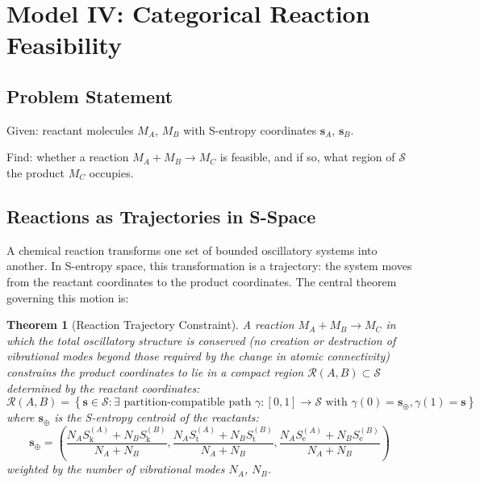 \documentclass[11pt,twocolumn,a4paper]{article}
\newtheorem{theorem}{Theorem}[section]
\theoremstyle{definition}
\theoremstyle{remark}
\newcommand{\Sk}{S_{\mathrm{k}}}
\newcommand{\St}{S_{\mathrm{t}}}
\newcommand{\Se}{S_{\mathrm{e}}}
\newcommand{\Sspace}{\mathcal{S}}
\begin{document}
\section{Model IV: Categorical Reaction Feasibility}
\label{sec:model4}

\subsection{Problem Statement}

Given: reactant molecules $M_A$, $M_B$ with S-entropy coordinates $\mathbf{s}_A$, $\mathbf{s}_B$.

Find: whether a reaction $M_A + M_B \to M_C$ is feasible, and if so, what region of $\Sspace$ the product $M_C$ occupies.

\subsection{Reactions as Trajectories in S-Space}

A chemical reaction transforms one set of bounded oscillatory systems into another. In S-entropy space, this transformation is a trajectory: the system moves from the reactant coordinates to the product coordinates. The central theorem governing this motion is:

\begin{theorem}[Reaction Trajectory Constraint]
\label{thm:reaction_trajectory}
A reaction $M_A + M_B \to M_C$ in which the total oscillatory structure is conserved (no creation or destruction of vibrational modes beyond those required by the change in atomic connectivity) constrains the product coordinates to lie in a compact region $\mathcal{R}(A, B) \subset \Sspace$ determined by the reactant coordinates:
\begin{equation}
\mathcal{R}(A, B) = \left\{ \mathbf{s} \in \Sspace : \exists \text{ partition-compatible path } \gamma: [0,1] \to \Sspace \text{ with } \gamma(0) = \mathbf{s}_{\oplus}, \gamma(1) = \mathbf{s} \right\}
\label{eq:reaction_region}
\end{equation}
where $\mathbf{s}_{\oplus}$ is the S-entropy centroid of the reactants:
\begin{equation}
\mathbf{s}_{\oplus} = \left( \frac{N_A \Sk^{(A)} + N_B \Sk^{(B)}}{N_A + N_B}, \frac{N_A \St^{(A)} + N_B \St^{(B)}}{N_A + N_B}, \frac{N_A \Se^{(A)} + N_B \Se^{(B)}}{N_A + N_B} \right)
\label{eq:centroid}
\end{equation}
weighted by the number of vibrational modes $N_A$, $N_B$.
\end{theorem}
\end{document}
